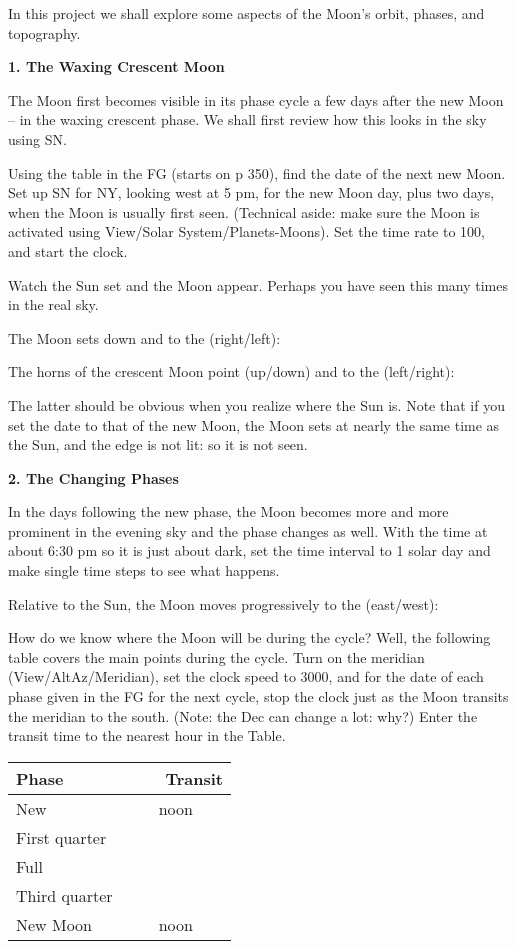 
\noindent
In this project we shall explore some aspects of the Moon's orbit,
phases, and topography.


\medskip \bigskip
\noindent
{\bf 1. The Waxing Crescent Moon}

\medskip\noindent The Moon first becomes visible in its phase cycle a
few days after the new Moon -- in the waxing crescent phase. 
We shall first review how this looks in
the sky using SN.

Using the table in the FG (starts on p 350), find the date of the next
new Moon. Set up SN for NY, looking west at 5 pm, for the new Moon
day, plus two days, when the Moon is usually first seen. (Technical
aside: make sure the Moon is activated using View/Solar
System/Planets-Moons). Set the time rate to 100, and start the clock.

Watch the Sun set and the Moon appear. Perhaps you have seen this many
times in the real sky.

\medskip
The Moon sets down and to the (right/left): \makebox[2cm]{\hrulefill}

The horns of the crescent Moon point (up/down) and to the (left/right): \makebox[2cm]{\hrulefill}

\medskip\noindent
The latter should be obvious when you realize where the Sun is. Note
that if you set the date to that of the new Moon, the
Moon sets at nearly the same time as the Sun, and the edge is not lit:
so it is not seen.

\bigskip
\noindent
{\bf 2. The Changing Phases}

\medskip \noindent
In the days following the new phase, the Moon becomes more and more
prominent in the evening sky and the phase changes as well.
With the time at about 6:30 pm so it is just about dark, set the time
interval to 1 solar day and make single time steps to see what happens.

\medskip
Relative to the Sun, the Moon moves progressively to the (east/west): \makebox[2cm]{\hrulefill}

\noindent \medskip
How do we know where the Moon will be during the cycle? Well, the
following table covers the main points during the cycle. Turn on the
meridian (View/AltAz/Meridian), set the clock speed to 3000,
and for the date of each phase given in the FG for the next cycle,
stop the clock just as the Moon transits the meridian to the
south. (Note: the Dec can change a lot: why?) Enter the transit time to the
nearest hour in the Table.

\bigskip
\begin{center}
\begin{tabular}{lc} \hline
Phase  & \ \ \ \ Transit  \\
 \hline
New   &    noon    \\ \hline
First quarter   &        \\ \hline
Full   &    \\ \hline
Third quarter   &        \\ \hline
New Moon    &  noon     \\ \hline
\end{tabular}
\end{center}


